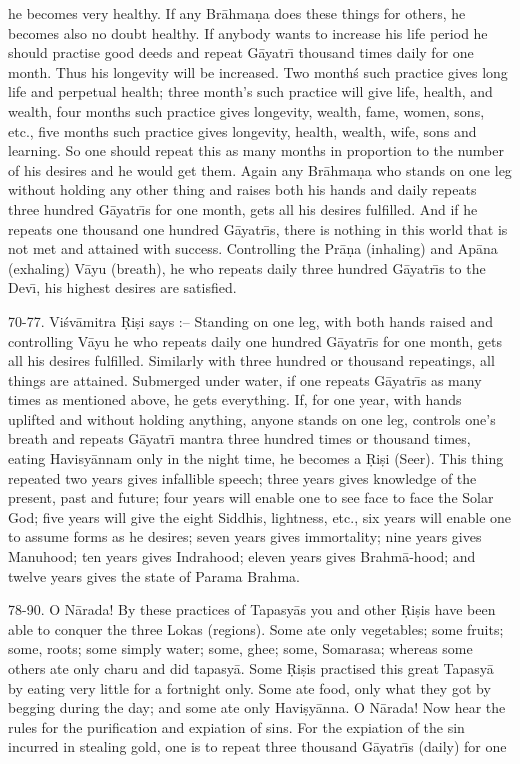 he becomes very healthy. If any Br\=ahma\d{n}a does these things for others, he becomes also no doubt healthy. If anybody wants to increase his life period he should practise good deeds and repeat G\=ayatr\={\i} thousand times daily for one month. Thus his longevity will be increased. Two month\'s such practice gives long life and perpetual health; three month's such practice will give life, health, and wealth, four months such practice gives longevity, wealth, fame, women, sons, etc., five months such practice gives longevity, health, wealth, wife, sons and learning. So one should repeat this as many months in proportion to the number of his desires and he would get them. Again any Br\=ahma\d{n}a who stands on one leg without holding any other thing and raises both his hands and daily repeats three hundred G\=ayatr\={\i}s for one month, gets all his desires fulfilled. And if he repeats one thousand one hundred G\=ayatr\={\i}s, there is nothing in this world that is not met and attained with success. Controlling the Pr\=a\d{n}a (inhaling) and Ap\=ana (exhaling) V\=ayu (breath), he who repeats daily three hundred G\=ayatr\={\i}s to the Dev\={\i}, his highest desires are satisfied.

70-77. Vi\'sv\=amitra \d{R}i\d{s}i says :-- Standing on one leg, with both hands raised and controlling V\=ayu he who repeats daily one hundred G\=ayatr\={\i}s for one month, gets all his desires fulfilled. Similarly with three hundred or thousand repeatings, all things are attained. Submerged under water, if one repeats G\=ayatr\={\i}s as many times as mentioned above, he gets everything. If, for one year, with hands uplifted and without holding anything, anyone stands on one leg, controls one's breath and repeats G\=ayatr\={\i} mantra three hundred times or thousand times, eating Havisy\=annam only in the night time, he becomes a \d{R}i\d{s}i (Seer). This thing repeated two years gives infallible speech; three years gives knowledge of the present, past and future; four years will enable one to see face to face the Solar God; five years will give the eight Siddhis, lightness, etc., six years will enable one to assume forms as he desires; seven years gives immortality; nine years gives Manuhood; ten years gives Indrahood; eleven years gives Brahm\=a-hood; and twelve years gives the state of Parama Brahma.

78-90. O N\=arada! By these practices of Tapasy\=as you and other \d{R}i\d{s}is have been able to conquer the three Lokas (regions). Some ate only vegetables; some fruits; some, roots; some simply water; some, ghee; some, Somarasa; whereas some others ate only charu and did tapasy\=a. Some \d{R}i\d{s}is practised this great Tapasy\=a by eating very little for a fortnight only. Some ate food, only what they got by begging during the day; and some ate only Havi\d{s}y\=anna. O N\=arada! Now hear the rules for the purification and expiation of sins. For the expiation of the sin incurred in stealing gold, one is to repeat three thousand G\=ayatr\={\i}s (daily) for one

